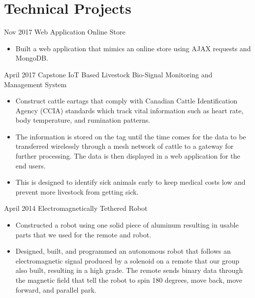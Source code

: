 \documentclass[]{friggeri-cv} %
\begin{document}
\section{Technical Projects}

\begin{entrylist}

\entryFirstPage
{Nov 2017}
{Web Application {\normalfont Online Store}}
{
\begin{itemize}
\item Built a web application that mimics an online store using AJAX requests
and MongoDB.\\
\end{itemize}
}
\entryFirstPage
{April 2017}
{Capstone {\normalfont IoT Based Livestock Bio-Signal Monitoring and Management System}}
{
\begin{itemize}
\item Construct cattle eartags that comply with Canadian Cattle Identification
Agency (CCIA) standards which track vital information such as heart rate, body
temperature, and rumination patterns.
\item The information is stored on the tag until the time comes for the
data to be transferred wirelessly through a mesh network of cattle to a gateway
for further processing. The data is then displayed in a web application for the
end users.
\item This is designed to identify sick animals early to keep medical costs low
and prevent more livestock from getting sick.\\
\end{itemize}
}


\entryFirstPage
{April 2014}
{Electromagnetically Tethered Robot}
{
\begin{itemize}
\item Constructed a robot using one solid piece of aluminum resulting in usable
parts that we used for the remote and robot.
\item Designed, built, and programmed an autonomous robot that follows an
electromagnetic signal produced by a
solenoid on a remote that our group also built, resulting in a high grade. The
remote sends binary data through
the magnetic field that tell the robot to spin 180 degrees, move back, move
forward, and parallel park.
\end{itemize}
}
\end{entrylist}
\end{document}
